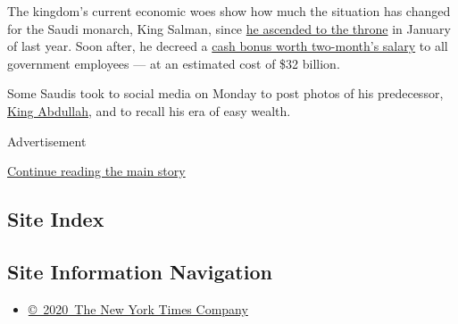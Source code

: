 The kingdom's current economic woes show how much the situation has
changed for the Saudi monarch, King Salman, since
\href{http://www.nytimes3xbfgragh.onion/2015/01/23/world/middleeast/salman-ascends-throne-to-become-saudi-king.html}{he
ascended to the throne} in January of last year. Soon after, he decreed
a
\href{http://www.nytimes3xbfgragh.onion/2015/02/20/world/middleeast/saudi-king-unleashes-a-torrent-as-bonuses-flow-to-the-masses.html}{cash
bonus worth two-month's salary} to all government employees --- at an
estimated cost of \$32 billion.

Some Saudis took to social media on Monday to post photos of his
predecessor,
\href{http://www.nytimes3xbfgragh.onion/2015/01/23/world/middleeast/king-abdullah-who-nudged-saudi-arabia-forward-dies-at-90.html?action=click\&contentCollection=Middle\%20East\&module=RelatedCoverage\&region=Marginalia\&pgtype=article}{King
Abdullah}, and to recall his era of easy wealth.

Advertisement

\protect\hyperlink{after-bottom}{Continue reading the main story}

\hypertarget{site-index}{%
\subsection{Site Index}\label{site-index}}

\hypertarget{site-information-navigation}{%
\subsection{Site Information
Navigation}\label{site-information-navigation}}

\begin{itemize}
\tightlist
\item
  \href{https://help.nytimes3xbfgragh.onion/hc/en-us/articles/115014792127-Copyright-notice}{©~2020~The
  New York Times Company}
\end{itemize}

